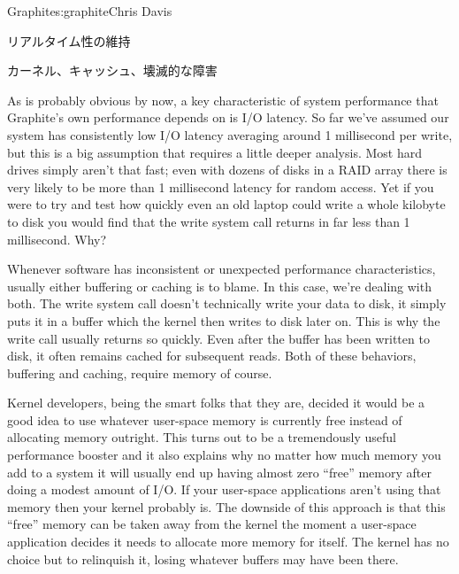 \begin{aosachapter}{Graphite}{s:graphite}{Chris Davis}
\begin{aosasect1}{リアルタイム性の維持}
\end{aosasect1}

\vspace{-0.1cm} %

\begin{aosasect1}{カーネル、キャッシュ、壊滅的な障害}

\vspace{-0.1cm} %

As is probably obvious by now, a key characteristic of system
performance that Graphite's own performance depends on is I/O latency.
So far we've assumed our system has consistently low I/O latency
averaging around 1 millisecond per write, but this is a big assumption
that requires a little deeper analysis. Most hard drives simply aren't
that fast; even with dozens of disks in a RAID array there is very
likely to be more than 1 millisecond latency for random access. Yet if
you were to try and test how quickly even an old laptop could write a
whole kilobyte to disk you would find that the write system call
returns in far less than 1 millisecond. Why?

Whenever software has inconsistent or unexpected performance
characteristics, usually either buffering or caching is to blame. In
this case, we're dealing with both. The write system call doesn't
technically write your data to disk, it simply puts it in a buffer
which the kernel then writes to disk later on. This is why the write
call usually returns so quickly. Even after the buffer has been
written to disk, it often remains cached for subsequent reads. Both of
these behaviors, buffering and caching, require memory of
course.

Kernel developers, being the smart folks that they are, decided it
would be a good idea to use whatever user-space memory is currently
free instead of allocating memory outright. This turns out to be a
tremendously useful performance booster and it also explains why no
matter how much memory you add to a system it will usually end up
having almost zero ``free'' memory after doing a modest amount of
I/O\@. If your user-space applications aren't using that memory then
your kernel probably is. The downside of this approach is that this
``free'' memory can be taken away from the kernel the moment a
user-space application decides it needs to allocate more memory for
itself. The kernel has no choice but to relinquish it, losing whatever
buffers may have been there.


\end{aosasect1}
\end{aosachapter}
